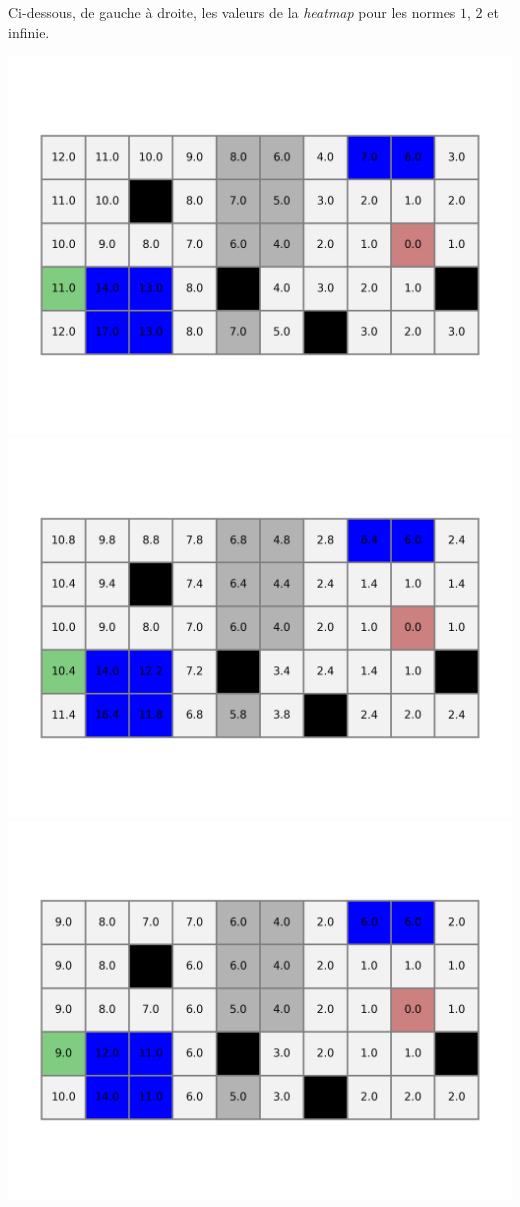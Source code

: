 \documentclass[11pt,class=report,crop=false]{standalone}
\begin{document}
Ci-dessous, de gauche à droite, les valeurs de la \emph{heatmap} pour les normes $1$, $2$ et infinie.
\begin{center}
	\includegraphics[scale=\myscale,scale=0.33,trim={0 2cm 0 2cm},clip]{figures/terrain-01-4}
	\includegraphics[scale=\myscale,scale=0.33,trim={0 2cm 0 2cm},clip]{figures/terrain-01-5}
	\includegraphics[scale=\myscale,scale=0.33,trim={0 2cm 0 2cm},clip]{figures/terrain-01-6}
\end{center}
\end{document}
